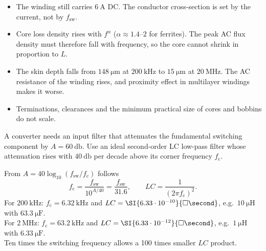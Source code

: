 
\begin{solutionblock}
	\begin{itemize}
		\item The winding still carries $\SI{6}{\ampere}$ DC. The conductor cross-section is set by the current, not by $f_\mathrm{sw}$.
		\item Core loss density rises with $f^{\alpha}$ ($\alpha\approx1.4$--$2$ for ferrites). The peak AC flux density must therefore fall with frequency, so the core cannot shrink in proportion to $L$.
		\item The skin depth falls from $\SI{148}{\micro\meter}$ at $\SI{200}{\kilo\hertz}$ to $\SI{15}{\micro\meter}$ at $\SI{20}{\mega\hertz}$. The AC resistance of the winding rises, and proximity effect in multilayer windings makes it worse.
		\item Terminations, clearances and the minimum practical size of cores and bobbins do not scale.
	\end{itemize}
\end{solutionblock}



A converter needs an input filter that attenuates the fundamental switching component by $A=\SI{60}{\decibel}$. Use an ideal second-order LC low-pass filter whose attenuation rises with $\SI{40}{\decibel}$ per decade above its corner frequency $f_\mathrm{c}$.


\begin{solutionblock}
	From $A = 40\log_{10}\left(f_\mathrm{sw}/f_\mathrm{c}\right)$ follows
	\begin{equation}
		f_\mathrm{c} = \frac{f_\mathrm{sw}}{10^{A/40}} = \frac{f_\mathrm{sw}}{31.6}, \qquad LC = \frac{1}{\left(2\pi f_\mathrm{c}\right)^2}.
	\end{equation}
	For $\SI{200}{\kilo\hertz}$: $f_\mathrm{c}=\SI{6.32}{\kilo\hertz}$ and $LC=\SI{6.33 \cdot 10^{-10}}{\square\second}$, e.g.\ $\SI{10}{\micro\henry}$ with $\SI{63.3}{\micro\farad}$.\\
	For $\SI{2}{\mega\hertz}$: $f_\mathrm{c}=\SI{63.2}{\kilo\hertz}$ and $LC=\SI{6.33 \cdot 10^{-12}}{\square\second}$, e.g.\ $\SI{1}{\micro\henry}$ with $\SI{6.33}{\micro\farad}$.\\
	Ten times the switching frequency allows a 100 times smaller $LC$ product.
\end{solutionblock}

